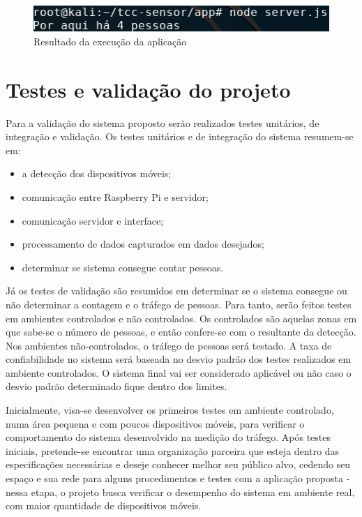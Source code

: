 \begin{figure}[!h]
  \caption{\label{exec-bash}Resultado da execução da aplicação}
  \begin{center}
    \includegraphics[width=1.0\textwidth]{img/bash.png}
  \end{center}
\end{figure}

\section{Testes e validação do projeto}
Para a validação do sistema proposto serão realizados testes unitários, de integração e
validação. Os testes unitários e de integração do sistema resumem-se em:

\begin{itemize}
  \item a detecção dos dispositivos móveis;
  \item comunicação entre Raspberry Pi e servidor;
  \item comunicação servidor e interface;
  \item processamento de dados capturados em dados desejados;
  \item determinar se sistema consegue contar pessoas.
\end{itemize}

Já os testes de validação são resumidos em determinar se o sistema consegue ou
não determinar a contagem e o tráfego de pessoas. Para tanto, serão feitos testes em
ambientes controlados e não controlados. Os controlados são
aquelas zonas em que sabe-se o número de pessoas, e então confere-se com o resultante da
detecção. Nos ambientes não-controlados, o tráfego de pessoas será testado.
A taxa de confiabilidade no sistema será baseada no desvio padrão dos testes
realizados em ambiente controlados.
O sistema final vai ser considerado aplicável ou não caso o desvio
padrão determinado fique dentro
dos limites.

Inicialmente, visa-se desenvolver os primeiros testes em ambiente
controlado, numa área pequena e com poucos dispositivos móveis, para verificar o
comportamento do sistema desenvolvido na medição do tráfego. Após testes
iniciais, pretende-se encontrar uma organização parceira que esteja dentro das
especificações necessárias e deseje conhecer melhor seu público alvo, cedendo
seu espaço e sua rede para alguns procedimentos e testes com a aplicação proposta
 - nessa etapa, o projeto busca verificar o desempenho do
sistema em ambiente real, com maior quantidade de dispositivos móveis.

